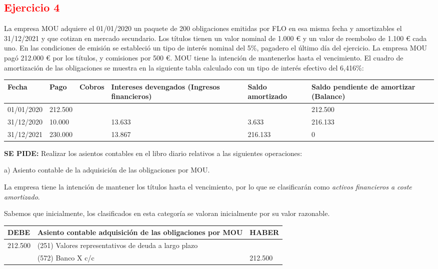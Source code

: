 \newpage 
\subsection*{\textcolor{red}{\textbf{Ejercicio 4}}}


La empresa MOU adquiere el 01/01/2020 un paquete de 200 obligaciones emitidas por FLO en esa misma fecha y amortizables el 31/12/2021 y que cotizan en mercado secundario. Los títulos tienen un valor nominal de 1.000 € y un valor de reembolso de 1.100 € cada uno. En las condiciones de emisión se estableció un tipo de interés nominal del 5\%, pagadero el último día del ejercicio. La empresa MOU pagó 212.000 € por los títulos, y comisiones por 500 €. MOU tiene la intención de mantenerlos hasta el vencimiento. El cuadro de amortización de las obligaciones se muestra en la siguiente tabla calculado con un tipo de interés efectivo del 6,416\%:

\begin{table}[H]
\centering
\begin{tabular}{|p{2cm}|p{2cm}|p{2cm}|p{2cm}|p{2cm}|p{2cm}|}
    \hline
    Fecha & Pago & Cobros & Intereses devengados (Ingresos financieros) & Saldo amortizado & Saldo pendiente de amortizar (Balance) \\
    \hline
    01/01/2020 & 212.500 & & & & 212.500 \\
    \hline
    31/12/2020 & 10.000 & & 13.633 & 3.633 & 216.133 \\
    \hline
    31/12/2021 & 230.000 & & 13.867 & 216.133 & 0 \\
    \hline
\end{tabular}
\end{table}

\textbf{SE PIDE:} Realizar los asientos contables en el libro diario relativos a las siguientes operaciones:

a) Asiento contable de la adquisición de las obligaciones por MOU.

La empresa tiene la intención de mantener los títulos hasta el vencimiento, por lo que se clasificarán como \textit{activos financieros a coste amortizado}.

Sabemos que inicialmente, los clasificados en esta categoría se valoran inicialmente por su valor razonable.

\begin{table}[H]
    \centering
    \begin{tabular}{|p{3cm}|p{6cm}|p{3cm}|}
    \hline
    \rowcolor{blue!30}
    \textbf{DEBE} & \textbf{Asiento contable adquisición de las obligaciones por MOU} & \textbf{HABER} \\
    \hline
    212.500 & (251) Valores representativos de deuda a largo plazo & \\
    \hline
    & (572) Banco X c/c & 212.500 \\
    \hline
    \end{tabular}
\end{table}


